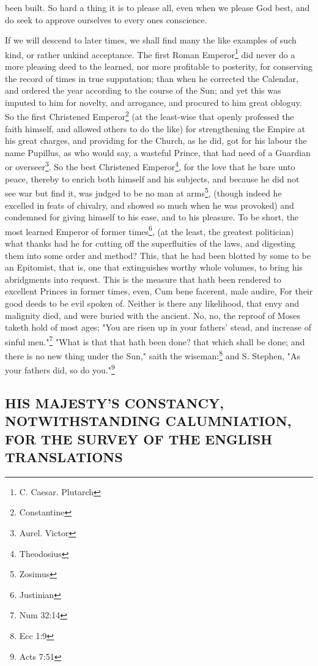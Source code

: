 been built. So hard a thing it is to please all, even when we please God best, and do seek to approve ourselves to every ones conscience.

If we will descend to later times, we shall find many the like examples of such kind, or rather unkind acceptance. The first Roman Emperor\footnote{C. Caesar. Plutarch} did never do a more pleasing deed to the learned, nor more profitable to posterity, for conserving the record of times in true supputation; than when he corrected the Calendar, and ordered the year according to the course of the Sun; and yet this was imputed to him for novelty, and arrogance, and procured to him great obloguy. So the first Christened Emperor\footnote{Constantine} (at the least-wise that openly professed the faith himself, and allowed others to do the like) for strengthening the Empire at his great charges, and providing for the Church, as he did, got for his labour the name Pupillus, as who would say, a wasteful Prince, that had need of a Guardian or overseer\footnote{Aurel. Victor}. So the best Christened Emperor\footnote{Theodosius}, for the love that he bare unto peace, thereby to enrich both himself and his subjects, and because he did not see war but find it, was judged to be no man at arms\footnote{Zosimus}, (though indeed he excelled in feats of chivalry, and showed so much when he was provoked) and condemned for giving himself to his ease, and to his pleasure. To be short, the most learned Emperor of former times\footnote{Justinian}, (at the least, the greatest politician) what thanks had he for cutting off the superfluities of the laws, and digesting them into some order and method? This, that he had been blotted by some to be an Epitomist, that is, one that extinguishes worthy whole volumes, to bring his abridgments into request. This is the measure that hath been rendered to excellent Princes in former times, even, Cum bene facerent, male audire, For their good deeds to be evil spoken of. Neither is there any likelihood, that envy and malignity died, and were buried with the ancient. No, no, the reproof of Moses taketh hold of most ages; "You are risen up in your fathers' stead, and increase of sinful men."\footnote{Num 32:14} "What is that that hath been done? that which shall be done; and there is no new thing under the Sun," saith the wiseman:\footnote{Ecc 1:9} and S. Stephen, "As your fathers did, so do you."\footnote{Acts 7:51}

\subsection{HIS MAJESTY'S CONSTANCY, NOTWITHSTANDING CALUMNIATION, FOR THE SURVEY OF THE ENGLISH TRANSLATIONS}

